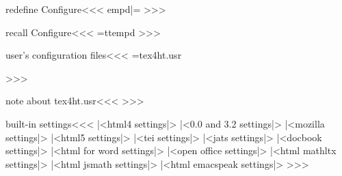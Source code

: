\<redefine Configure\><<<
\let\:tempd|=\Configure
\def\Configure#1#2{%
   \:CheckOption{#1}\if:Option \def\:tempc{#2}\fi}
>>>

\<recall Configure\><<<
\let\Configure|=\:tempd
>>>


\<user's configuration files\><<<
=tex4ht.usr  \else {} 
   
\fi
>>>

\<note about tex4ht.usr\><<<
>>>


\<built-in settings\><<<
|<html4 settings|>
|<0.0 and 3.2 settings|>
|<mozilla settings|>
|<html5 settings|>
|<tei settings|>
|<jats settings|>
|<docbook settings|>
|<html for word settings|>
|<open office settings|>
|<html mathltx settings|>
|<html jsmath settings|>
|<html emacspeak settings|>
>>>



